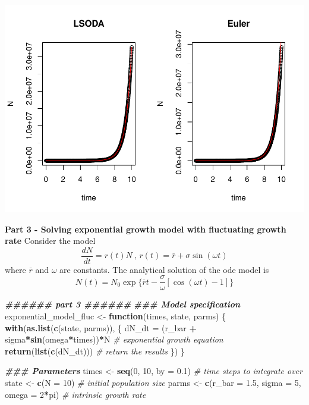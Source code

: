\documentclass[
]{book}
\newenvironment{Shaded}{\begin{snugshade}}{\end{snugshade}}
\newcommand{\AttributeTok}[1]{\textcolor[rgb]{0.13,0.29,0.53}{#1}}
\newcommand{\CommentTok}[1]{\textcolor[rgb]{0.56,0.35,0.01}{\textit{#1}}}
\newcommand{\ControlFlowTok}[1]{\textcolor[rgb]{0.13,0.29,0.53}{\textbf{#1}}}
\newcommand{\DecValTok}[1]{\textcolor[rgb]{0.00,0.00,0.81}{#1}}
\newcommand{\DocumentationTok}[1]{\textcolor[rgb]{0.56,0.35,0.01}{\textbf{\textit{#1}}}}
\newcommand{\FloatTok}[1]{\textcolor[rgb]{0.00,0.00,0.81}{#1}}
\newcommand{\FunctionTok}[1]{\textcolor[rgb]{0.13,0.29,0.53}{\textbf{#1}}}
\newcommand{\NormalTok}[1]{#1}
\newcommand{\OtherTok}[1]{\textcolor[rgb]{0.56,0.35,0.01}{#1}}
\newcommand{\SpecialCharTok}[1]{\textcolor[rgb]{0.81,0.36,0.00}{\textbf{#1}}}
\begin{document}
\includegraphics{bookdown-demo_files/figure-latex/unnamed-chunk-6-2.pdf}

\textbf{Part 3 - Solving exponential growth model with fluctuating growth rate}
Consider the model
\[
\frac{dN}{dt} = r(t)N \ \text{, } r(t) = \overline{r} + \sigma\sin(\omega t)
\]
where \(\overline{r}\) and \(\omega\) are constants.
The analytical solution of the ode model is
\[
N(t) = N_0\exp\{\overline{r}t - \frac{\sigma}{\omega}[\cos(\omega t) - 1]\}
\]

\begin{Shaded}
\begin{Highlighting}[]
\DocumentationTok{\#\#\#\#\#\# part 3 \#\#\#\#\#\#}
\DocumentationTok{\#\#\# Model specification}
\NormalTok{exponential\_model\_fluc }\OtherTok{\textless{}{-}} \ControlFlowTok{function}\NormalTok{(times, state, parms) \{}
  \FunctionTok{with}\NormalTok{(}\FunctionTok{as.list}\NormalTok{(}\FunctionTok{c}\NormalTok{(state, parms)), \{}
\NormalTok{    dN\_dt }\OtherTok{=}\NormalTok{ (r\_bar }\SpecialCharTok{+}\NormalTok{ sigma}\SpecialCharTok{*}\FunctionTok{sin}\NormalTok{(omega}\SpecialCharTok{*}\NormalTok{times))}\SpecialCharTok{*}\NormalTok{N  }\CommentTok{\# exponential growth equation}
    \FunctionTok{return}\NormalTok{(}\FunctionTok{list}\NormalTok{(}\FunctionTok{c}\NormalTok{(dN\_dt)))  }\CommentTok{\# return the results}
\NormalTok{  \})}
\NormalTok{\}}
\end{Highlighting}
\end{Shaded}

\begin{Shaded}
\begin{Highlighting}[]
\DocumentationTok{\#\#\# Parameters}
\NormalTok{times }\OtherTok{\textless{}{-}} \FunctionTok{seq}\NormalTok{(}\DecValTok{0}\NormalTok{, }\DecValTok{10}\NormalTok{, }\AttributeTok{by =} \FloatTok{0.1}\NormalTok{)  }\CommentTok{\# time steps to integrate over}
\NormalTok{state }\OtherTok{\textless{}{-}} \FunctionTok{c}\NormalTok{(}\AttributeTok{N =} \DecValTok{10}\NormalTok{)  }\CommentTok{\# initial population size}
\NormalTok{parms }\OtherTok{\textless{}{-}} \FunctionTok{c}\NormalTok{(}\AttributeTok{r\_bar =} \FloatTok{1.5}\NormalTok{, }\AttributeTok{sigma =} \DecValTok{5}\NormalTok{, }\AttributeTok{omega =} \DecValTok{2}\SpecialCharTok{*}\NormalTok{pi)  }\CommentTok{\# intrinsic growth rate}
\end{Highlighting}
\end{Shaded}
\end{document}

